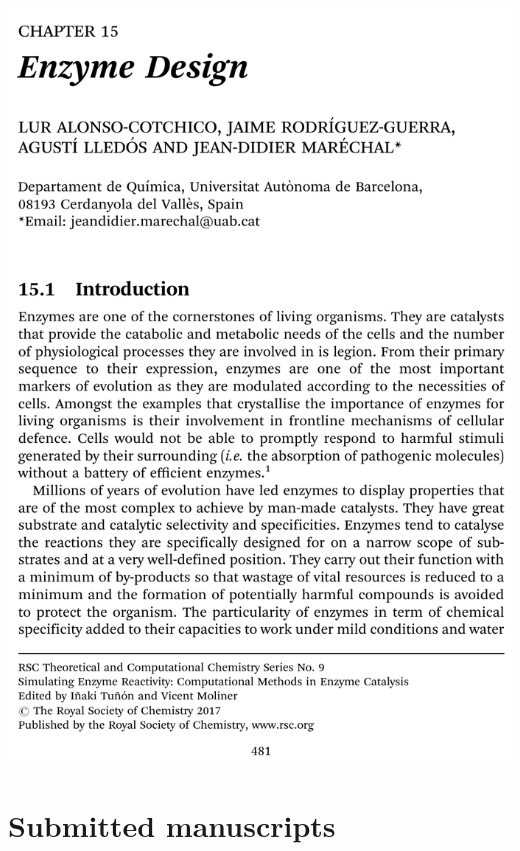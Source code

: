 \includegraphics[width=\textwidth]{figures/pubs/rsc-chapter.pdf}

\chapter*{Submitted manuscripts}


